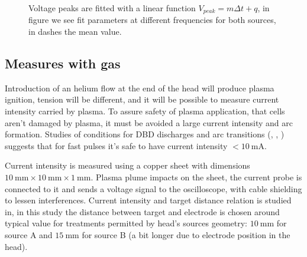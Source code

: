 \begin{figure}
 \centering
 \caption{Voltage peaks are fitted with a linear function $V_{peak} = m \Delta t + q$, in figure we see fit parameters at different frequencies for both sources, in dashes the mean value.}
 \label{fig:linnogas}
\end{figure}


\subsection{Measures with gas}
Introduction of an helium flow at the end of the head will produce plasma ignition, tension will be different, and it will be possible to measure current intensity carried by plasma. To assure safety of plasma application, that cells aren't damaged by plasma, it must be avoided a large current intensity and arc formation. Studies of conditions for DBD discharges and arc transitions (\cite{kogelschatz:jpa-00255561}, \cite{TOMAI2006409}, \cite{PhysRev.34.876}) suggests that for fast pulses it's safe to have current intensity $< \SI{10}{\milli\ampere}$.

Current intensity is measured using a copper sheet with dimensions $\SI{10}{\milli\meter} \times \SI{10}{\milli\meter} \times \SI{1}{\milli\meter}$. Plasma plume impacts on the sheet, the current probe is connected to it and sends a voltage signal to the oscilloscope, with cable shielding to lessen interferences.
Current intensity and target distance relation is studied in\cite{unipd:ceciliaDBD}, in this study the distance between target and electrode is chosen around typical value for treatments permitted by head's sources geometry: $\SI{10}{\milli\meter}$ for source A and $\SI{15}{\milli\meter}$ for source B (a bit longer due to electrode position in the head).


